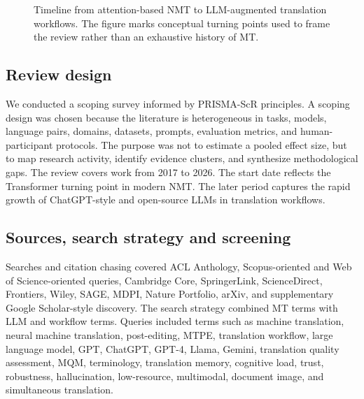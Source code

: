 \documentclass[11pt]{article}
\begin{document}
\begin{figure}[t]
\centering
{}
\caption{Timeline from attention-based NMT to LLM-augmented translation workflows. The figure marks conceptual turning points used to frame the review rather than an exhaustive history of MT.}
\end{figure}

\subsection{Review design}
We conducted a scoping survey informed by PRISMA-ScR principles. A scoping design was chosen because the literature is heterogeneous in tasks, models, language pairs, domains, datasets, prompts, evaluation metrics, and human-participant protocols. The purpose was not to estimate a pooled effect size, but to map research activity, identify evidence clusters, and synthesize methodological gaps. The review covers work from 2017 to 2026. The start date reflects the Transformer turning point in modern NMT. The later period captures the rapid growth of ChatGPT-style and open-source LLMs in translation workflows.

\subsection{Sources, search strategy and screening}
Searches and citation chasing covered ACL Anthology, Scopus-oriented and Web of Science-oriented queries, Cambridge Core, SpringerLink, ScienceDirect, Frontiers, Wiley, SAGE, MDPI, Nature Portfolio, arXiv, and supplementary Google Scholar-style discovery. The search strategy combined MT terms with LLM and workflow terms. Queries included terms such as machine translation, neural machine translation, post-editing, MTPE, translation workflow, large language model, GPT, ChatGPT, GPT-4, Llama, Gemini, translation quality assessment, MQM, terminology, translation memory, cognitive load, trust, robustness, hallucination, low-resource, multimodal, document image, and simultaneous translation.
\end{document}
